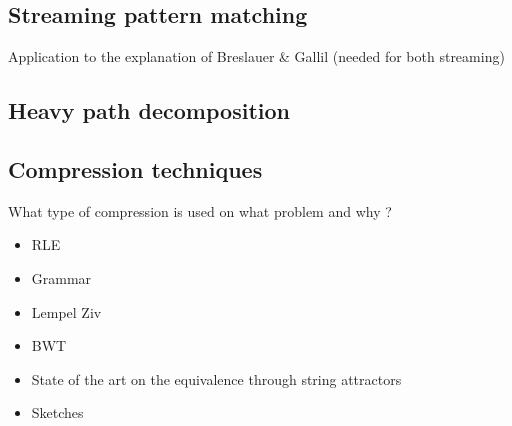 \subsection{Streaming pattern matching}
Application to the explanation of Breslauer \& Gallil (needed for both streaming)

\subsection{Heavy path decomposition}


\subsection{Compression techniques}
What type of compression is used on what problem and why ?
\begin{itemize}
\item RLE
\item Grammar
\item Lempel Ziv
\item BWT
\item State of the art on the equivalence through string attractors
\item Sketches
\end{itemize}